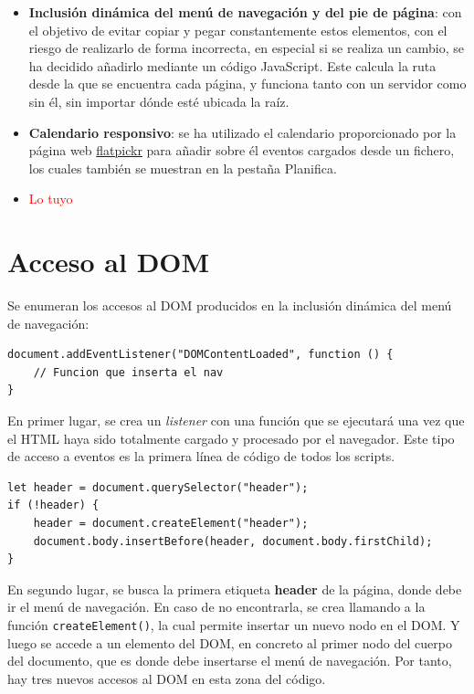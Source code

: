 \documentclass[11pt, a4paper]{book}
\begin{document}
	\begin{itemize}
		\item \textbf{Inclusión dinámica del menú de navegación y del pie de página}: con el objetivo de evitar copiar y pegar constantemente estos elementos, con el riesgo de realizarlo de forma incorrecta, en especial si se realiza un cambio, se ha decidido añadirlo mediante un código JavaScript. Este calcula la ruta desde la que se encuentra cada página, y funciona tanto con un servidor como sin él, sin importar dónde esté ubicada la raíz.
		\item \textbf{Calendario responsivo}: se ha utilizado el calendario proporcionado por la página web \href{https://flatpickr.js.org/}{flatpickr} para añadir sobre él eventos cargados desde un fichero, los cuales también se muestran en la pestaña Planifica.
		\item \textcolor{red}{Lo tuyo}
	\end{itemize}

	
	
	\section{Acceso al DOM}
	
	Se enumeran los accesos al DOM producidos en la inclusión dinámica del menú de navegación:
	
	\begin{lstlisting}
document.addEventListener("DOMContentLoaded", function () {
	// Funcion que inserta el nav
}
	\end{lstlisting}

	En primer lugar, se crea un \textit{listener} con una función que se ejecutará una vez que el HTML haya sido totalmente cargado y procesado por el navegador. Este tipo de acceso a eventos es la primera línea de código de todos los scripts.
	
	\begin{lstlisting}
let header = document.querySelector("header");
if (!header) {
	header = document.createElement("header");
	document.body.insertBefore(header, document.body.firstChild);
}
	\end{lstlisting}

	En segundo lugar, se busca la primera etiqueta \textbf{header} de la página, donde debe ir el menú de navegación. En caso de no encontrarla, se crea llamando a la función \texttt{createElement()}, la cual permite insertar un nuevo nodo en el DOM. Y luego se accede a un elemento del DOM, en concreto al primer nodo del cuerpo del documento, que es donde debe insertarse el menú de navegación.	Por tanto, hay tres nuevos accesos al DOM en esta zona del código. 
	
\end{document}
